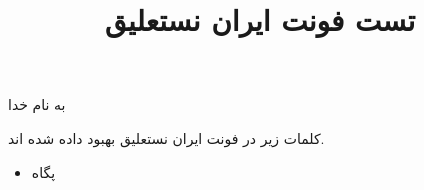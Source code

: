 \documentclass[14pt,a4paper]{article}
\begin{document}
\title{تست فونت ایران نستعلیق}
\author{ }
\date{ }
\maketitle


\begin{center}
به نام خدا
\end{center}

کلمات زیر در فونت ایران نستعلیق بهبود داده شده اند.

\begin{itemize}
\item پگاه
\end{itemize}
\end{document}
